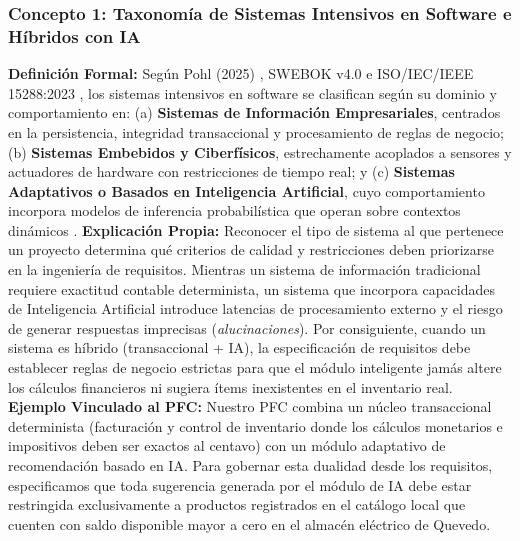 \subsubsection{Concepto 1: Taxonomía de Sistemas Intensivos en Software e Híbridos con IA}
\textbf{Definición Formal:} Según Pohl (2025) \cite{pohl2025}, SWEBOK v4.0 \cite{swebok2024} e ISO/IEC/IEEE 15288:2023 \cite{ieee15288}, los sistemas intensivos en software se clasifican según su dominio y comportamiento en: (a) \textbf{Sistemas de Información Empresariales}, centrados en la persistencia, integridad transaccional y procesamiento de reglas de negocio; (b) \textbf{Sistemas Embebidos y Ciberfísicos}, estrechamente acoplados a sensores y actuadores de hardware con restricciones de tiempo real; y (c) \textbf{Sistemas Adaptativos o Basados en Inteligencia Artificial}, cuyo comportamiento incorpora modelos de inferencia probabilística que operan sobre contextos dinámicos \cite{pohl2025, swebok2024}.
\textbf{Explicación Propia:} Reconocer el tipo de sistema al que pertenece un proyecto determina qué criterios de calidad y restricciones deben priorizarse en la ingeniería de requisitos. Mientras un sistema de información tradicional requiere exactitud contable determinista, un sistema que incorpora capacidades de Inteligencia Artificial introduce latencias de procesamiento externo y el riesgo de generar respuestas imprecisas (\textit{alucinaciones}). Por consiguiente, cuando un sistema es híbrido (transaccional + IA), la especificación de requisitos debe establecer reglas de negocio estrictas para que el módulo inteligente jamás altere los cálculos financieros ni sugiera ítems inexistentes en el inventario real.
\textbf{Ejemplo Vinculado al PFC:} Nuestro PFC combina un núcleo transaccional determinista (facturación y control de inventario donde los cálculos monetarios e impositivos deben ser exactos al centavo) con un módulo adaptativo de recomendación basado en IA. Para gobernar esta dualidad desde los requisitos, especificamos que toda sugerencia generada por el módulo de IA debe estar restringida exclusivamente a productos registrados en el catálogo local que cuenten con saldo disponible mayor a cero en el almacén eléctrico de Quevedo.
